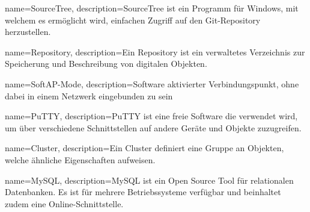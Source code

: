 {
  name=SourceTree,
  description={SourceTree ist ein Programm für Windows, mit welchem es ermöglicht wird, einfachen Zugriff auf den Git-Repository herzustellen. \cite{sourceTree}}
}

{
  name=Repository,
  description={Ein Repository ist ein verwaltetes Verzeichnis zur Speicherung und Beschreibung von digitalen Objekten.  \cite{rep}}
}

{
  name=SoftAP-Mode,
  description={Software aktivierter Verbindungspunkt, ohne dabei in einem Netzwerk eingebunden zu sein}
}

{
  name=PuTTY,
  description={PuTTY ist eine freie Software die verwendet wird, um über verschiedene Schnittstellen auf andere Geräte und Objekte zuzugreifen.  \cite{putt}}
}

{
  name=Cluster,
  description={Ein Cluster definiert eine Gruppe an Objekten, welche ähnliche Eigenschaften aufweisen.  \cite{cluster}}
}

{
  name=MySQL,
  description={MySQL ist ein Open Source Tool für relationalen Datenbanken. Es ist für mehrere Betriebssysteme verfügbar und beinhaltet zudem eine Online-Schnittstelle. \cite{mySQL}}
}


\glsaddall

\printglossary[style=super, nonumberlist]

